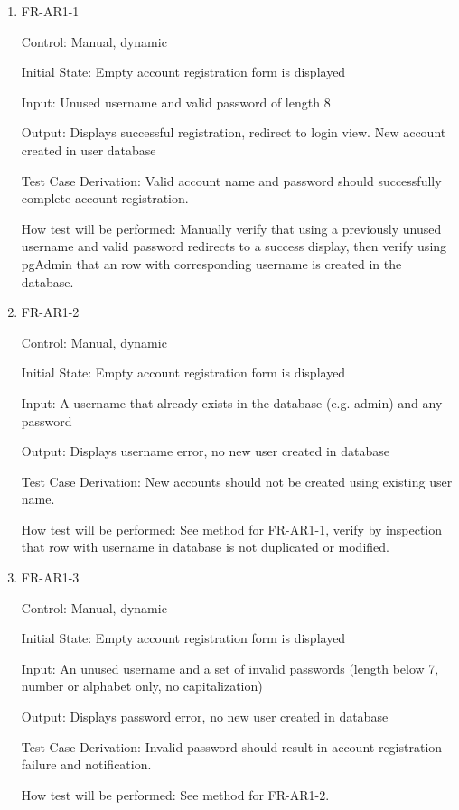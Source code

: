 \documentclass[12pt, titlepage]{article}
\begin{document}
\begin{enumerate}

\item{FR-AR1-1\\}

Control: Manual, dynamic
					
Initial State: Empty account registration form is displayed
					 
Input: Unused username and valid password of length 8
					
Output: Displays successful registration, redirect to login view. New account created in user database

Test Case Derivation: Valid account name and password should successfully complete account registration.
					
How test will be performed: Manually verify that using a previously unused username and valid password redirects to a success display, then verify using pgAdmin that an row with corresponding username is created in the database.

\item{FR-AR1-2\\}

Control: Manual, dynamic
					
Initial State: Empty account registration form is displayed
					
Input: A username that already exists in the database (e.g. admin) and any password
					
Output: Displays username error, no new user created in database

Test Case Derivation: New accounts should not be created using existing user name.
					
How test will be performed: See method for FR-AR1-1, verify by inspection that row with username in database is not duplicated or modified.

\item{FR-AR1-3\\}

Control: Manual, dynamic
					
Initial State: Empty account registration form is displayed
					
Input: An unused username and a set of invalid passwords (length below 7, number or alphabet only, no capitalization)
					
Output: Displays password error, no new user created in database

Test Case Derivation: Invalid password should result in account registration failure and notification.
					
How test will be performed: See method for FR-AR1-2.

\end{enumerate}
\end{document}
